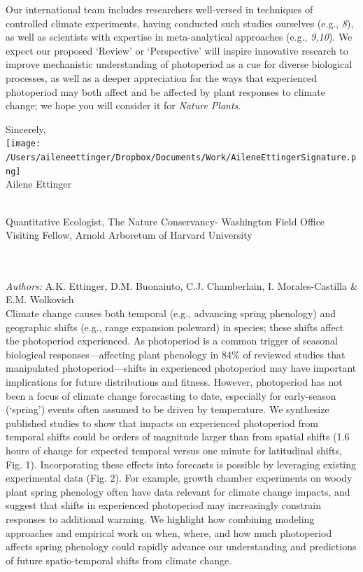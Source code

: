 \documentclass[10.5pt,a4paper]{letter}
\begin{document}
\begin{letter}{}
\par Our international team includes researchers well-versed in techniques of controlled climate experiments, having conducted such studies ourselves (e.g., \emph{8}), as well as scientists with expertise in meta-analytical approaches (e.g., \emph{9,10}). We expect our proposed `Review' or `Perspective' will inspire innovative research to
improve mechanistic understanding of photoperiod as a cue for diverse biological processes, as well as a deeper appreciation for the ways that experienced photoperiod may both affect and be affected by plant responses to climate change; we hope you will consider it for \emph{Nature Plants}.

\par Sincerely,\\

\texttt{[image: /Users/aileneettinger/Dropbox/Documents/Work/AileneEttingerSignature.png]} \\
Ailene Ettinger
\begin{footnotesize}\\
Quantitative Ecologist, The Nature Conservancy- Washington Field Office\\
Visiting Fellow, Arnold Arboretum of Harvard University 
\end{footnotesize}

\newpage
{}\\
\\
\noindent \emph{Authors:} A.K. Ettinger, D.M. Buonaiuto, C.J. Chamberlain, I. Morales-Castilla \& E.M. Wolkovich
\\

Climate change causes both temporal (e.g., advancing spring phenology) and geographic shifts (e.g., range expansion poleward) in species; these shifts affect the photoperiod experienced. As photoperiod is a common trigger of seasonal biological responses---affecting plant phenology in 84\% of reviewed studies that manipulated photoperiod---shifts in experienced photoperiod may have important implications for future distributions and fitness. However, photoperiod has not been a focus of climate change forecasting to date, especially for early-season (`spring') events often assumed to be driven by temperature. We synthesize published studies to show that impacts on experienced photoperiod from temporal shifts could be orders of magnitude larger than from spatial shifts (1.6 hours of change for expected temporal versus one minute for latitudinal shifts, Fig. 1). Incorporating these effects into forecasts is possible by leveraging existing experimental data (Fig. 2). For example, growth chamber experiments on woody plant spring phenology often have data relevant for climate change impacts, and suggest that shifts in experienced photoperiod may increasingly constrain responses to additional warming. We highlight how combining modeling approaches and empirical work on when, where, and how much photoperiod affects spring phenology could rapidly advance our understanding and predictions of future spatio-temporal shifts from climate change.


\end{letter}
\end{document}
